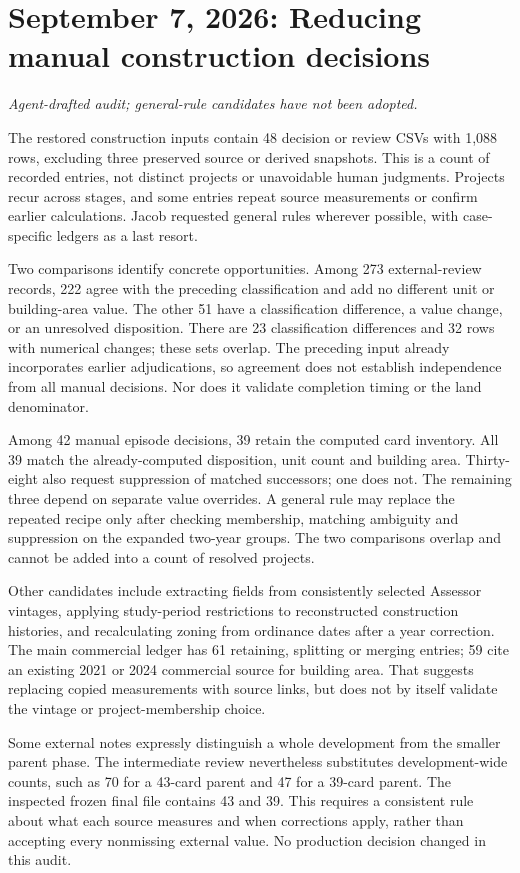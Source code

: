 \section*{September 7, 2026: Reducing manual construction decisions}
\textit{Agent-drafted audit; general-rule candidates have not been adopted.}

The restored construction inputs contain 48 decision or review CSVs with
1,088 rows, excluding three preserved source or derived snapshots. This is a
count of recorded entries, not distinct projects or unavoidable human judgments.
Projects recur across stages, and some entries repeat source measurements or
confirm earlier calculations. Jacob requested general rules wherever possible,
with case-specific ledgers as a last resort.

Two comparisons identify concrete opportunities. Among 273 external-review
records, 222 agree with the preceding classification and add no different unit
or building-area value. The other 51 have a classification difference, a value
change, or an unresolved disposition. There are 23 classification differences
and 32 rows with numerical changes; these sets overlap. The preceding input
already incorporates earlier adjudications, so agreement does not establish
independence from all manual decisions. Nor does it validate completion timing
or the land denominator.

Among 42 manual episode decisions, 39 retain the computed card inventory. All
39 match the already-computed disposition, unit count and building area.
Thirty-eight also request suppression of matched successors; one does not.
The remaining three depend on separate value overrides. A general rule may
replace the repeated recipe only after checking membership, matching ambiguity
and suppression on the expanded two-year groups. The two comparisons overlap
and cannot be added into a count of resolved projects.

Other candidates include extracting fields from consistently selected Assessor
vintages, applying study-period restrictions to reconstructed construction
histories, and recalculating zoning from ordinance dates after a year correction.
The main commercial ledger has 61 retaining, splitting or merging entries;
59 cite an existing 2021 or 2024 commercial source for building area. That
suggests replacing copied measurements with source links, but does not by
itself validate the vintage or project-membership choice.

Some external notes expressly distinguish a whole development from the smaller
parent phase. The intermediate review nevertheless substitutes development-wide
counts, such as 70 for a 43-card parent and 47 for a 39-card parent. The inspected
frozen final file contains 43 and 39. This requires a consistent rule about what
each source measures and when corrections apply, rather than accepting every
nonmissing external value. No production decision changed in this audit.

